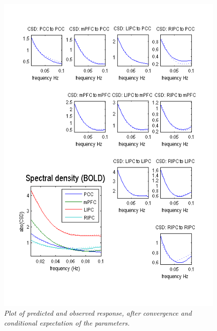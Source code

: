\begin{figure}[ht]
\begin{center}
\includegraphics[width=140mm]{dcm_rs/Fig2}
\caption{\em Plot of predicted and observed response, after convergence and conditional expectation of the parameters.\label{spdcm_Fig2}}
\end{center}
\end{figure}

